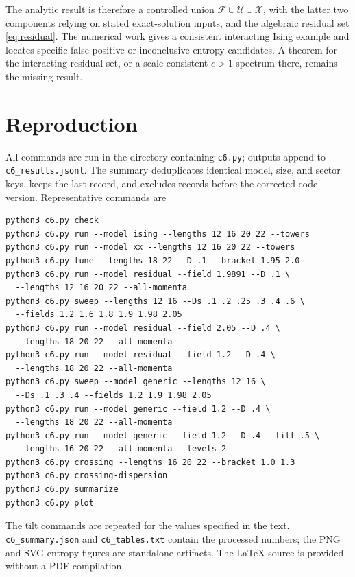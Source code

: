 \documentclass[11pt]{article}
\newcommand{\F}{\mathcal F}
\newcommand{\U}{\mathcal U}
\newcommand{\X}{\mathcal X}
\begin{document}
The analytic result is therefore a controlled union $\F\cup\U\cup\X$,
with the latter two components relying on stated exact-solution inputs, and
the algebraic residual set \eqref{eq:residual}. The numerical work gives a
consistent interacting Ising example and locates specific false-positive
or inconclusive entropy candidates. A theorem for the interacting residual
set, or a scale-consistent $c>1$ spectrum there, remains the missing result.

\appendix
\section{Reproduction}

All commands are run in the directory containing \texttt{c6.py}; outputs
append to \texttt{c6\_results.jsonl}. The summary deduplicates identical
model, size, and sector keys, keeps the last record, and excludes records
before the corrected code version. Representative commands are
\begin{verbatim}
python3 c6.py check
python3 c6.py run --model ising --lengths 12 16 20 22 --towers
python3 c6.py run --model xx --lengths 12 16 20 22 --towers
python3 c6.py tune --lengths 18 22 --D .1 --bracket 1.95 2.0
python3 c6.py run --model residual --field 1.9891 --D .1 \
  --lengths 12 16 20 22 --all-momenta
python3 c6.py sweep --lengths 12 16 --Ds .1 .2 .25 .3 .4 .6 \
  --fields 1.2 1.6 1.8 1.9 1.98 2.05
python3 c6.py run --model residual --field 2.05 --D .4 \
  --lengths 18 20 22 --all-momenta
python3 c6.py run --model residual --field 1.2 --D .4 \
  --lengths 18 20 22 --all-momenta
python3 c6.py sweep --model generic --lengths 12 16 \
  --Ds .1 .3 .4 --fields 1.2 1.9 1.98 2.05
python3 c6.py run --model generic --field 1.2 --D .4 \
  --lengths 18 20 22 --all-momenta
python3 c6.py run --model generic --field 1.2 --D .4 --tilt .5 \
  --lengths 16 20 22 --all-momenta --levels 2
python3 c6.py crossing --lengths 16 20 22 --bracket 1.0 1.3
python3 c6.py crossing-dispersion
python3 c6.py summarize
python3 c6.py plot
\end{verbatim}
The tilt commands are repeated for the values specified in the text.
\texttt{c6\_summary.json} and \texttt{c6\_tables.txt} contain the processed
numbers; the PNG and SVG entropy figures are standalone artifacts. The
LaTeX source is provided without a PDF compilation.
\end{document}
